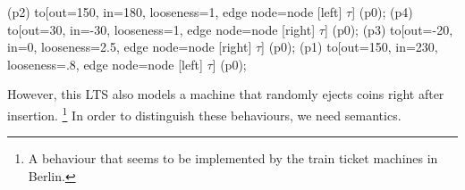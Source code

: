 \begin{isabellebody}
\begin{isamarkuptext}
{    \draw (p2) to[out=150, in=180, looseness=1, edge node={node [left] {$\tau$}}] (p0);
    \draw (p4) to[out=30, in=-30, looseness=1, edge node={node [right] {$\tau$}}] (p0);
    \draw (p3) to[out=-20, in=0, looseness=2.5, edge node={node [right] {$\tau$}}] (p0);
    \draw (p1) to[out=150, in=230, looseness=.8, edge node={node [left] {$\tau$}}] (p0);
}

However, this LTS also models a machine that randomly ejects coins right after insertion.%
\footnote{A behaviour that seems to be implemented by the train ticket machines in Berlin.}
In order to distinguish these behaviours, we need \LTSt{} semantics.

\end{isamarkuptext}
\end{isabellebody}
